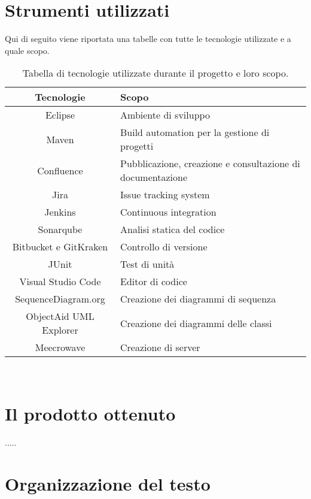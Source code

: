 \section{Strumenti utilizzati}
Qui di seguito viene riportata una tabelle con tutte le tecnologie utilizzate e a quale scopo.

    \begin{table}[H]
        {\def\arraystretch{1.5}
        \begin{tabularx}{\textwidth}{c | X}
            \rowcolor{beautyblue}
            \textbf{Tecnologie} &
            \textbf{Scopo} \\ \hline
            Eclipse & Ambiente di sviluppo \\
            Maven & Build automation per la gestione di progetti \\
            Confluence & Pubblicazione, creazione e consultazione di documentazione \\
            Jira & Issue tracking system \\
            Jenkins & Continuous integration \\
            Sonarqube & Analisi statica del codice \\
            Bitbucket e GitKraken & Controllo di versione \\
            JUnit & Test di unità \\
            Visual Studio Code & Editor di codice \\
            SequenceDiagram.org & Creazione dei diagrammi di sequenza \\
            ObjectAid UML Explorer & Creazione dei diagrammi delle classi \\
            Meecrowave & Creazione di server \\
        \end{tabularx}} \\
    \caption{Tabella di tecnologie utilizzate durante il progetto e loro scopo.}
    \end{table}


\section{Il prodotto ottenuto}
.....

\section{Organizzazione del testo}

